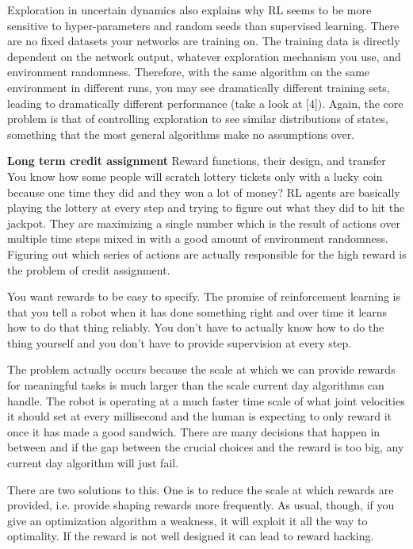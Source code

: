 Exploration in uncertain dynamics also explains why RL seems to be more sensitive to hyper-parameters and random seeds than supervised learning. There are no fixed datasets your networks are training on. The training data is directly dependent on the network output, whatever exploration mechanism you use, and environment randomness. Therefore, with the same algorithm on the same environment in different runs, you may see dramatically different training sets, leading to dramatically different performance (take a look at [4]). Again, the core problem is that of controlling exploration to see similar distributions of states, something that the most general algorithms make no assumptions over.


\textbf{Long term credit assignment}
Reward functions, their design, and transfer
You know how some people will scratch lottery tickets only with a lucky coin because one time they did and they won a lot of money? RL agents are basically playing the lottery at every step and trying to figure out what they did to hit the jackpot. They are maximizing a single number which is the result of actions over multiple time steps mixed in with a good amount of environment randomness. Figuring out which series of actions are actually responsible for the high reward is the problem of credit assignment.

You want rewards to be easy to specify. The promise of reinforcement learning is that you tell a robot when it has done something right and over time it learns how to do that thing reliably. You don’t have to actually know how to do the thing yourself and you don’t have to provide supervision at every step.

The problem actually occurs because the scale at which we can provide rewards for meaningful tasks is much larger than the scale current day algorithms can handle. The robot is operating at a much faster time scale of what joint velocities it should set at every millisecond and the human is expecting to only reward it once it has made a good sandwich. There are many decisions that happen in between and if the gap between the crucial choices and the reward is too big, any current day algorithm will just fail.

There are two solutions to this. One is to reduce the scale at which rewards are provided, i.e. provide shaping rewards more frequently. As usual, though, if you give an optimization algorithm a weakness, it will exploit it all the way to optimality. If the reward is not well designed it can lead to reward hacking.

